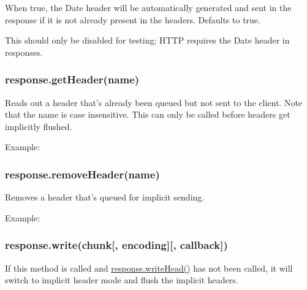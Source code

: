 When true, the Date header will be automatically generated and sent in
the response if it is not already present in the headers. Defaults to
true.

This should only be disabled for testing; HTTP requires the Date header
in responses.

\subsubsection{response.getHeader(name)}\label{response.getheadername}

Reads out a header that's already been queued but not sent to the
client. Note that the name is case insensitive. This can only be called
before headers get implicitly flushed.

Example:

\begin{Shaded}
\begin{Highlighting}[]
 \NormalTok{(}\NormalTok{);}
\end{Highlighting}
\end{Shaded}

\subsubsection{response.removeHeader(name)}\label{response.removeheadername}

Removes a header that's queued for implicit sending.

Example:

\begin{Shaded}
\begin{Highlighting}[]
\NormalTok{(}\NormalTok{);}
\end{Highlighting}
\end{Shaded}

\subsubsection{response.write(chunk{[}, encoding{]}{[},
callback{]})}\label{response.writechunk-encoding-callback}

If this method is called and
\hyperref[httpux5fresponseux5fwriteheadux5fstatuscodeux5freasonphraseux5fheaders]{response.writeHead()}
has not been called, it will switch to implicit header mode and flush
the implicit headers.

